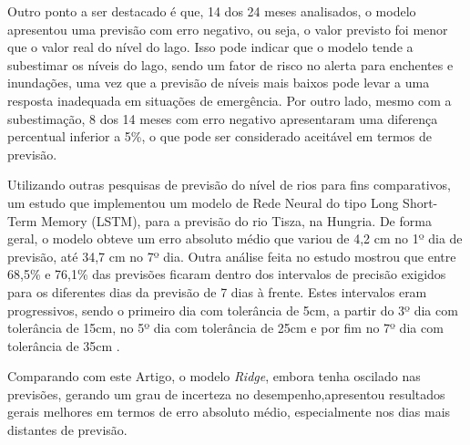 Outro ponto a ser destacado é que, 14 dos 24 meses analisados, o modelo apresentou uma previsão com erro negativo, ou seja, o valor previsto foi menor que o valor real do nível do lago. Isso pode indicar que o modelo tende a subestimar os níveis do lago, sendo um fator de risco no alerta para enchentes e inundações, uma vez que a previsão de níveis mais baixos pode levar a uma resposta inadequada em situações de emergência. Por outro lado, mesmo com a subestimação, 8 dos 14 meses com erro negativo apresentaram uma diferença percentual inferior a 5\%, o que pode ser considerado aceitável em termos de previsão. 

Utilizando outras pesquisas de previsão do nível de rios para fins comparativos, um estudo que implementou um modelo de Rede Neural do tipo Long Short-Term Memory (LSTM), para a previsão do rio Tisza, na Hungria. De forma geral, o modelo obteve um erro absoluto médio que variou de 4,2 cm no 1º dia de previsão, até 34,7 cm no 7º dia. Outra análise feita no estudo mostrou que entre 68,5\% e 76,1\% das previsões ficaram dentro dos intervalos de precisão exigidos para os diferentes dias da previsão de 7 dias à frente. Estes intervalos eram progressivos, sendo o primeiro dia com tolerância de 5cm, a partir do 3º dia com tolerância de 15cm, no 5º dia com tolerância de 25cm e por fim no 7º dia com tolerância de 35cm \cite{Vizi2023}.

Comparando com este Artigo, o modelo \textit{Ridge}, embora tenha oscilado nas previsões, gerando um grau de incerteza no desempenho,apresentou resultados gerais melhores em termos de erro absoluto médio, especialmente nos dias mais distantes de previsão.